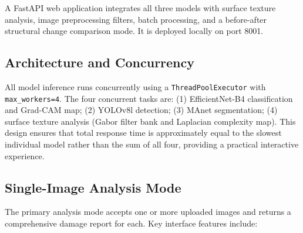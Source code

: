 \documentclass[12pt,a4paper]{article}
\begin{document}
A FastAPI web application integrates all three models with surface texture analysis, image preprocessing filters, batch processing, and a before-after structural change comparison mode. It is deployed locally on port 8001.

\subsection{Architecture and Concurrency}

All model inference runs concurrently using a \texttt{ThreadPoolExecutor} with \texttt{max\_workers=4}. The four concurrent tasks are: (1) EfficientNet-B4 classification and Grad-CAM map; (2) YOLOv8l detection; (3) MAnet segmentation; (4) surface texture analysis (Gabor filter bank and Laplacian complexity map). This design ensures that total response time is approximately equal to the slowest individual model rather than the sum of all four, providing a practical interactive experience.

\subsection{Single-Image Analysis Mode}

The primary analysis mode accepts one or more uploaded images and returns a comprehensive damage report for each. Key interface features include:
\end{document}
